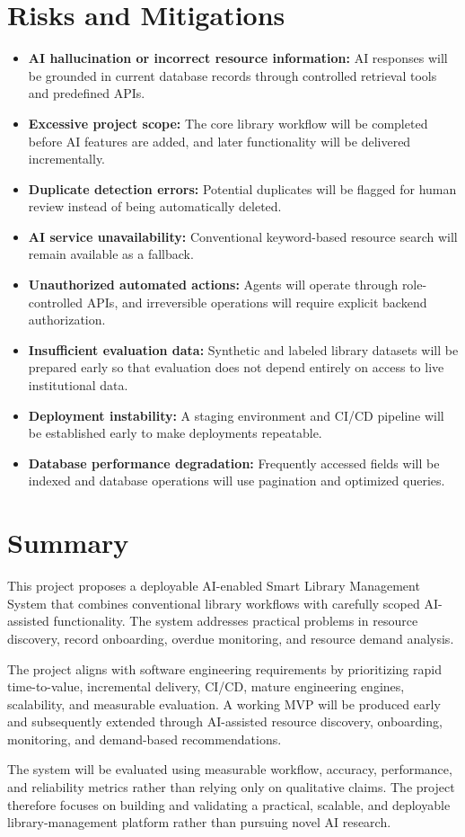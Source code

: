 \documentclass[11pt]{article}
\begin{document}
\section{Risks and Mitigations}
\begin{itemize}
    \item \textbf{AI hallucination or incorrect resource information:} AI responses will be grounded in current database records through controlled retrieval tools and predefined APIs.
    \item \textbf{Excessive project scope:} The core library workflow will be completed before AI features are added, and later functionality will be delivered incrementally.
    \item \textbf{Duplicate detection errors:} Potential duplicates will be flagged for human review instead of being automatically deleted.
    \item \textbf{AI service unavailability:} Conventional keyword-based resource search will remain available as a fallback.
    \item \textbf{Unauthorized automated actions:} Agents will operate through role-controlled APIs, and irreversible operations will require explicit backend authorization.
    \item \textbf{Insufficient evaluation data:} Synthetic and labeled library datasets will be prepared early so that evaluation does not depend entirely on access to live institutional data.
    \item \textbf{Deployment instability:} A staging environment and CI/CD pipeline will be established early to make deployments repeatable.
    \item \textbf{Database performance degradation:} Frequently accessed fields will be indexed and database operations will use pagination and optimized queries.
\end{itemize}

\section{Summary}
This project proposes a deployable AI-enabled Smart Library Management System that combines conventional library workflows with carefully scoped AI-assisted functionality. The system addresses practical problems in resource discovery, record onboarding, overdue monitoring, and resource demand analysis.

The project aligns with software engineering requirements by prioritizing rapid time-to-value, incremental delivery, CI/CD, mature engineering engines, scalability, and measurable evaluation. A working MVP will be produced early and subsequently extended through AI-assisted resource discovery, onboarding, monitoring, and demand-based recommendations.

The system will be evaluated using measurable workflow, accuracy, performance, and reliability metrics rather than relying only on qualitative claims. The project therefore focuses on building and validating a practical, scalable, and deployable library-management platform rather than pursuing novel AI research.
\end{document}
